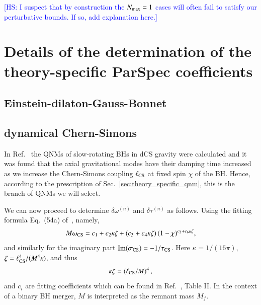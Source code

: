 \documentclass[twocolumn,
               prd,
               aps,
               superscriptaddress,
               tightenlines,
               nofootinbib,
               eqsecnum,
               amsfonts,
               amsmath,
               longbibliography]{revtex4-1}
\newcommand{\Mf}{M_f}
\newcommand{\hs}[1]{{\textcolor{blue}{{[HS: #1]}} }}
\begin{document}
\hs{I suspect that by construction the $N_{\rm max} = 1$ cases will often fail to satisfy our
perturbative bounds. If so, add explanation here.}

%

\appendix

\section{Details of the determination of the theory-specific
ParSpec coefficients}
\label{app:map_details}

\subsection{Einstein-dilaton-Gauss-Bonnet}
\label{app:map_edgb}

\subsection{dynamical Chern-Simons}
\label{app:map_dcs}

%
In Ref.~\cite{Wagle:2021tam} the QNMs of slow-rotating BHs in dCS gravity were calculated
and it was found that the axial gravitational modes have their damping time increased as we
increase the Chern-Simons coupling $\ell_{\rm CS}$ at fixed spin $\chi$ of the BH.
%
Hence, according to the prescription of Sec.~\ref{sec:theory_specific_qnm}, this is the branch of QNMs we will select.

We can now proceed to determine $\delta\omega^{(n)}$ and $\delta\tau^{(n)}$ as follows.
%
Using the fitting formula Eq.~(54a) of~\cite{Wagle:2021tam}, namely,
%
\begin{equation}
    M \omega_{\rm CS} = c_{1} + c_{2} \kappa \zeta + (c_{3} + c_{4} \kappa \zeta) \, (1 - \chi)^{c_{5} + c_{6} \kappa \zeta},
    \label{eq:omega_dsc_eg}
\end{equation}
%
and similarly for the imaginary part ${\rm Im}(\sigma_{\rm CS}) =  - 1 / \tau_{\rm CS}$.
%
Here $\kappa = 1/(16 \pi)$, $\zeta = \ell_{\rm CS}^{4} / (M^4 \kappa)$, and thus
%
\begin{equation}
\kappa \zeta = (\ell_{\rm CS} / M)^4 \,,
\end{equation}
%
and $c_{i}$ are fitting coefficients which can be found in Ref.~\cite{Wagle:2021tam}, Table II.
%
In the context of a binary BH merger, $M$ is interpreted as the remnant mass $\Mf$.
\end{document}
